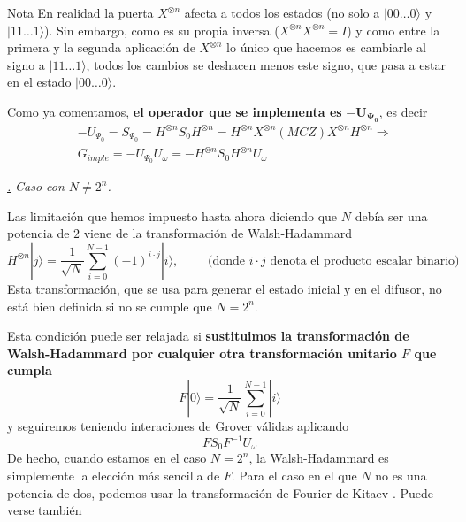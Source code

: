 \documentclass[a4paper,11pt]{book} %
\numberwithin{equation}{chapter}
\def\subsubiContadorIt{\par\addtocounter{subsubsection}{1}\underline{\it\thesubsubsection.}\hskip0.5cm \setcounter{subsubsubsectionIt}{0}}
\newcommand{\SubsubiIt}[1]{
		\subsubiContadorIt \textit{#1}
	}
\newcounter{subsubsubsectionIt}[subsubsection]
\begin{document}
	\begin{mybox_blue}{Nota}
	En realidad la puerta $X^{\otimes n}$ afecta a todos los estados (no solo a $|00 \dots 0 \rangle $ y $|11 \dots 1 \rangle$).
	Sin embargo, como es su propia inversa ($X^{\otimes n}X^{\otimes n} = I$) y como entre la primera y la segunda 
	aplicación de $X^{\otimes n}$ lo único que hacemos 	es cambiarle al signo a $|11 \dots 1 \rangle$, todos los 
	cambios se deshacen menos este signo, que pasa a estar en el estado $|00 \dots 0 \rangle $. 
	\end{mybox_blue}

Como ya comentamos,\textbf{ el operador que se implementa es} $\bm{-U_{\Psi_0}}$, es decir
\begin{equation} \label{ec_cons-imple_U_Psi0}
\begin{aligned} 
& \boxed{-U_{\Psi_0}  = S_{\Psi_0}  = H^{\otimes n} S_0 H^{\otimes n} = H^{\otimes n} X^{\otimes n} (MCZ) X^{\otimes n} H^{\otimes n}} \Rightarrow  \\ 
& \boxed{G_{imple}  =  - U_{\Psi_0} U_\omega = - H^{\otimes n} S_0 H^{\otimes n} U_\omega}
\end{aligned}
\end{equation}


\SubsubiIt{Caso con $N \neq 2^n$.} \label{sub-sec_N-no-2^n} \label{sec_subsec_N_neq_2n}

Las limitación que hemos impuesto hasta ahora diciendo que $N$ debía ser una potencia de $2$ viene de la transformación de Walsh-Hadammard 
\begin{equation}
H^{\otimes n} |j \rangle = \frac{1}{\sqrt{N}} \sum^{N-1}_{i=0} (-1)^{i \cdot j} | i \rangle, \qquad \text{ (donde } i \cdot j \text{ denota el producto escalar binario)}
\end{equation}
Esta transformación, que se usa para generar el estado inicial y en el difusor, no está bien definida si no se cumple que $N=2^n$.

Esta condición puede ser relajada si\textbf{ sustituimos la transformación de Walsh-Hadammard por cualquier otra transformación unitario $F$ que cumpla}
\begin{equation} \label{ec_N-no-2n_T}
\boxed{F |0 \rangle = \frac{1}{\sqrt{N}} \sum^{N-1}_{i=0} | i \rangle}
\end{equation}
y seguiremos teniendo interaciones de Grover válidas aplicando 
\begin{equation}
F S_0 F^{-1} U_\omega
\end{equation}
De hecho, cuando estamos en el caso $N = 2^n$, la Walsh-Hadammard es simplemente la elección más sencilla de $F$. Para el caso en el que $N$ no es una potencia de dos, podemos usar la transformación de Fourier de Kitaev \cite{bib_kitaev1995quantum}. Puede verse también \cite{bib_PhysRevLett.80.4329} 
\end{document}
